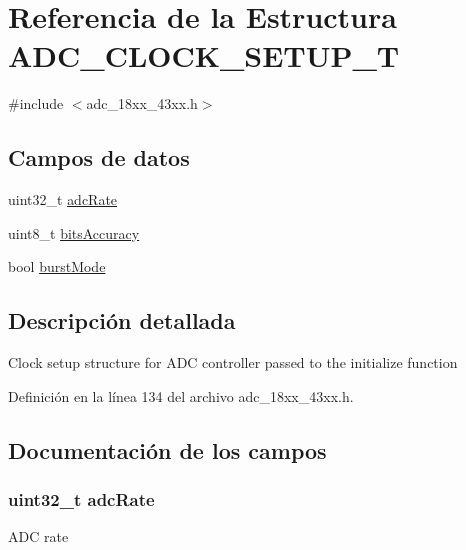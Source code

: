 \hypertarget{struct_a_d_c___c_l_o_c_k___s_e_t_u_p___t}{}\section{Referencia de la Estructura A\+D\+C\+\_\+\+C\+L\+O\+C\+K\+\_\+\+S\+E\+T\+U\+P\+\_\+T}
\label{struct_a_d_c___c_l_o_c_k___s_e_t_u_p___t}


{\ttfamily \#include $<$adc\+\_\+18xx\+\_\+43xx.\+h$>$}

\subsection*{Campos de datos}
\begin{DoxyCompactItemize}
\item 
uint32\+\_\+t \hyperlink{struct_a_d_c___c_l_o_c_k___s_e_t_u_p___t_a5746e54afba5bcbc680d594ffcb38ef9}{adc\+Rate}
\item 
uint8\+\_\+t \hyperlink{struct_a_d_c___c_l_o_c_k___s_e_t_u_p___t_a415ce3b64ae72d6b88a82bf4dc93a146}{bits\+Accuracy}
\item 
bool \hyperlink{struct_a_d_c___c_l_o_c_k___s_e_t_u_p___t_a9cf04ac4acb35c092c82ed4b4a3db4d5}{burst\+Mode}
\end{DoxyCompactItemize}


\subsection{Descripción detallada}
Clock setup structure for A\+DC controller passed to the initialize function 

Definición en la línea 134 del archivo adc\+\_\+18xx\+\_\+43xx.\+h.



\subsection{Documentación de los campos}
\subsubsection[{\texorpdfstring{adc\+Rate}{adcRate}}]{\setlength{\rightskip}{0pt plus 5cm}uint32\+\_\+t adc\+Rate}\hypertarget{struct_a_d_c___c_l_o_c_k___s_e_t_u_p___t_a5746e54afba5bcbc680d594ffcb38ef9}{}\label{struct_a_d_c___c_l_o_c_k___s_e_t_u_p___t_a5746e54afba5bcbc680d594ffcb38ef9}
A\+DC rate 

